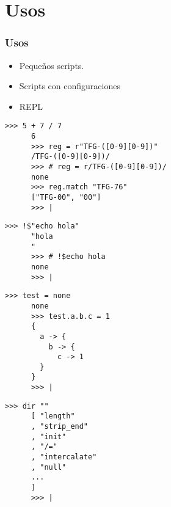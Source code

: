 \section{Usos}
\begin{frame}
  \frametitle{Usos}
  \begin{center}
    \begin{itemize}
      \item Pequeños scripts.
      \item Scripts con configuraciones
      \item REPL
    \end{itemize}
  \end{center}
  \framebreak{}
  \begin{center}
    \begin{lstlisting}[language=scriptflow]
      >>> 5 + 7 / 7
      6
      >>> reg = r"TFG-([0-9][0-9])"
      /TFG-([0-9][0-9])/
      >>> # reg = r/TFG-([0-9][0-9])/
      none
      >>> reg.match "TFG-76"
      ["TFG-00", "00"]
      >>> |
    \end{lstlisting}
  \end{center}

  \framebreak{}
  \begin{center}
    \begin{lstlisting}[language=scriptflow]
      >>> !$"echo hola"
      "hola
      "
      >>> # !$echo hola
      none
      >>> |
    \end{lstlisting}
  \end{center}

  \framebreak{}
  \begin{center}
    \begin{lstlisting}[language=scriptflow]
      >>> test = none
      none
      >>> test.a.b.c = 1
      {
        a -> {
          b -> {
            c -> 1
        }
      }
      >>> |
    \end{lstlisting}
  \end{center}

  \framebreak{}
  \begin{center}
    \begin{lstlisting}[language=scriptflow]
      >>> dir ""
      [ "length"
      , "strip_end"
      , "init"
      , "/="
      , "intercalate"
      , "null"
      ...
      ]
      >>> |
    \end{lstlisting}
  \end{center}


\end{frame}
